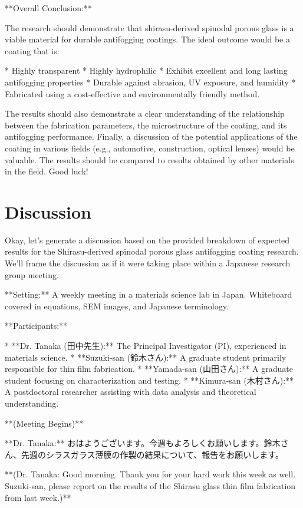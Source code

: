 \documentclass{article}
\begin{document}
**Overall Conclusion:**

The research should demonstrate that shirasu-derived spinodal porous glass is a viable material for durable antifogging coatings.  The ideal outcome would be a coating that is:

*   Highly transparent
*   Highly hydrophilic
*   Exhibit excellent and long lasting antifogging properties
*   Durable against abrasion, UV exposure, and humidity
*   Fabricated using a cost-effective and environmentally friendly method.

The results should also demonstrate a clear understanding of the relationship between the fabrication parameters, the microstructure of the coating, and its antifogging performance.  Finally, a discussion of the potential applications of the coating in various fields (e.g., automotive, construction, optical lenses) would be valuable. The results should be compared to results obtained by other materials in the field. Good luck!


\section{Discussion}
Okay, let's generate a discussion based on the provided breakdown of expected results for the Shirasu-derived spinodal porous glass antifogging coating research. We'll frame the discussion as if it were taking place within a Japanese research group meeting.

**Setting:** A weekly meeting in a materials science lab in Japan. Whiteboard covered in equations, SEM images, and Japanese terminology.

**Participants:**

*   **Dr. Tanaka (田中先生):** The Principal Investigator (PI), experienced in materials science.
*   **Suzuki-san (鈴木さん):** A graduate student primarily responsible for thin film fabrication.
*   **Yamada-san (山田さん):** A graduate student focusing on characterization and testing.
*   **Kimura-san (木村さん):** A postdoctoral researcher assisting with data analysis and theoretical understanding.

**(Meeting Begins)**

**Dr. Tanaka:** おはようございます。今週もよろしくお願いします。鈴木さん、先週のシラスガラス薄膜の作製の結果について、報告をお願いします。

**(Dr. Tanaka: Good morning. Thank you for your hard work this week as well. Suzuki-san, please report on the results of the Shirasu glass thin film fabrication from last week.)**
\end{document}
